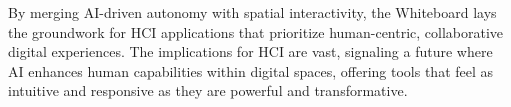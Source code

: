 By merging AI-driven autonomy with spatial interactivity, the Whiteboard lays the groundwork for HCI applications that prioritize human-centric, collaborative digital experiences.
The implications for HCI are vast, signaling a future where AI enhances human capabilities within digital spaces, offering tools that feel as intuitive and responsive as they are powerful and transformative.